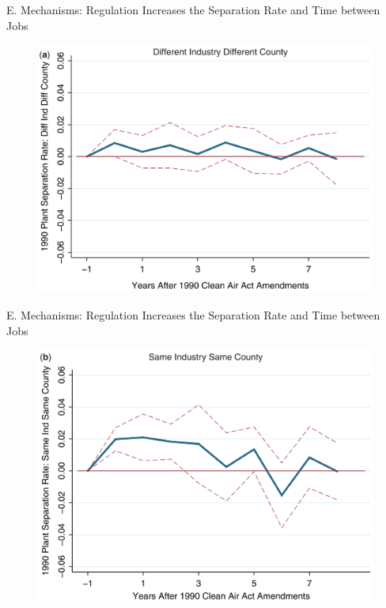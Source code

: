 \documentclass{beamer}
\begin{document}
\begin{frame}{E. Mechanisms: Regulation Increases the Separation Rate and Time between Jobs}
	\begin{figure}[h]
		\centering
		\includegraphics[scale=0.35]{figure6a.png}
	\end{figure}
\end{frame}
\begin{frame}{E. Mechanisms: Regulation Increases the Separation Rate and Time between Jobs}
	\begin{figure}[h]
		\centering
		\includegraphics[scale=0.35]{figure6b.png}
	\end{figure}
\end{frame}
\end{document}
